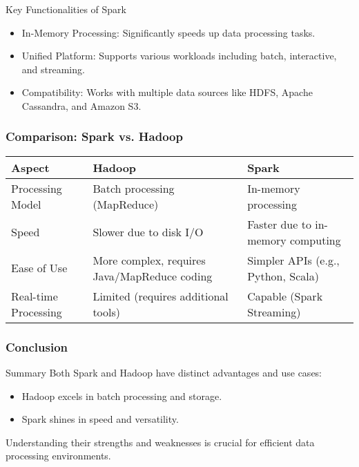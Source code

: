 \documentclass{beamer}
\begin{document}
\begin{frame}[fragile]
    \begin{block}{Key Functionalities of Spark}
        \begin{itemize}
            \item In-Memory Processing: Significantly speeds up data processing tasks.
            \item Unified Platform: Supports various workloads including batch, interactive, and streaming.
            \item Compatibility: Works with multiple data sources like HDFS, Apache Cassandra, and Amazon S3.
        \end{itemize}
    \end{block}
\end{frame}

\begin{frame}[fragile]
    \frametitle{Comparison: Spark vs. Hadoop}
    \begin{tabular}{|l|l|l|}
        \hline
        \textbf{Aspect} & \textbf{Hadoop} & \textbf{Spark} \\
        \hline
        Processing Model & Batch processing (MapReduce) & In-memory processing \\
        \hline
        Speed & Slower due to disk I/O & Faster due to in-memory computing \\
        \hline
        Ease of Use & More complex, requires Java/MapReduce coding & Simpler APIs (e.g., Python, Scala) \\
        \hline
        Real-time Processing & Limited (requires additional tools) & Capable (Spark Streaming) \\
        \hline
    \end{tabular}
\end{frame}

\begin{frame}[fragile]
    \frametitle{Conclusion}
    \begin{block}{Summary}
        Both Spark and Hadoop have distinct advantages and use cases:
        \begin{itemize}
            \item Hadoop excels in batch processing and storage.
            \item Spark shines in speed and versatility.
        \end{itemize}
        Understanding their strengths and weaknesses is crucial for efficient data processing environments.
    \end{block}
\end{frame}
\end{document}
